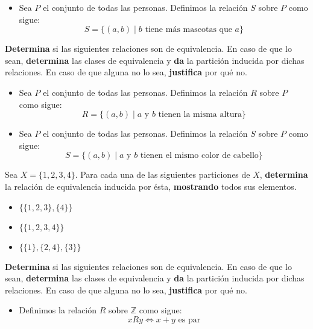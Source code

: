 \documentclass[oneside]{style}
\begin{document}
\begin{questions}[label=\protect\circled{\bfseries\arabic*}]
{\begin{itemize}
            \item Sea $P$ el conjunto de todas las personas. Definimos la
            relación $S$ sobre $P$ como sigue:
            \begin{equation*}
                S = \{(a,b) \; | \; b \text{ tiene más mascotas que } a\}
            \end{equation*}
        \end{itemize}
    }

    \question
    {
        \textbf{Determina} si las siguientes relaciones son de equivalencia. 
        En caso de que lo sean, \textbf{determina} las clases de equivalencia 
        y \textbf{da} la partición inducida por dichas relaciones. En caso de 
        que alguna no lo sea, \textbf{justifica} por qué no.
        \begin{itemize}
            \item Sea $P$ el conjunto de todas las personas. Definimos la 
            relación $R$ sobre $P$ como sigue:
            \begin{equation*}
                R = \{(a,b) \; | \; a \text{ y } b \text{ tienen la misma 
                altura}\}
            \end{equation*}

            \item Sea $P$ el conjunto de todas las personas. Definimos la
            relación $S$ sobre $P$ como sigue:
            \begin{equation*}
                S = \{(a,b) \; | \; a \text{ y } b \text{ tienen el mismo color 
                de cabello}\}
            \end{equation*}
        \end{itemize}
    }

    \question
    {
        Sea $X = \{1,2,3,4\}$. Para cada una de las siguientes particiones de 
        $X$, \textbf{determina} la relación de equivalencia inducida por ésta, 
        \textbf{mostrando} todos sus elementos.
        \begin{itemize}
            \item $\{\{1,2,3\}, \{4\}\}$
            \item $\{\{1,2,3,4\}\}$
            \item $\{\{1\}, \{2,4\}, \{3\}\}$
        \end{itemize}
    }

    \question
    {
        \textbf{Determina} si las siguientes relaciones son de equivalencia. 
        En caso de que lo sean, \textbf{determina} las clases de equivalencia 
        y \textbf{da} la partición inducida por dichas relaciones. En caso de 
        que alguna no lo sea, \textbf{justifica} por qué no.
        \begin{itemize}
            \item Definimos la relación $R$ sobre $\mathbb{Z}$ como sigue:
            \begin{equation*}
                xRy \Leftrightarrow x+y \text{ es par}
            \end{equation*}


\end{itemize}}
\end{questions}
\end{document}
